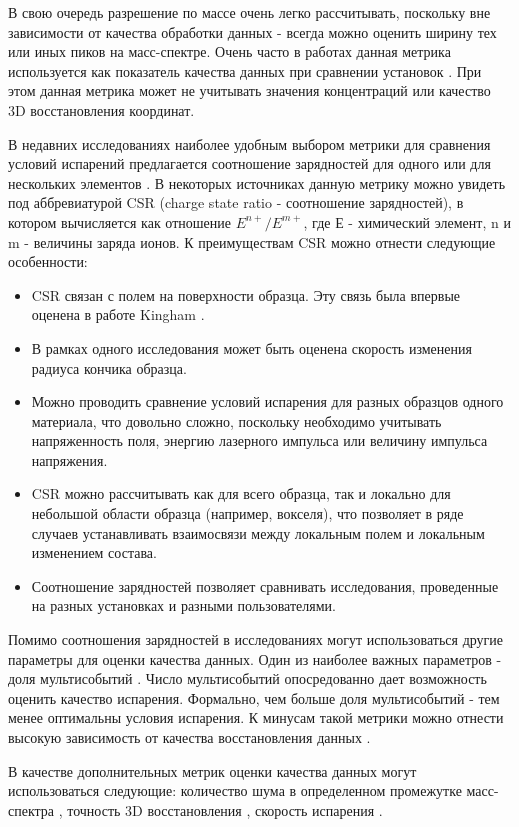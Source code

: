 В свою очередь разрешение по массе очень легко рассчитывать, поскольку вне зависимости от качества обработки данных - всегда можно оценить ширину тех или иных пиков на масс-спектре. Очень часто в работах данная метрика используется как показатель качества данных при сравнении установок \cite{Tegg23}. При этом данная метрика может не учитывать значения концентраций или качество 3D восстановления координат.

В недавних исследованиях наиболее удобным выбором метрики для сравнения условий испарений предлагается соотношение зарядностей для одного или для нескольких элементов \cite{Tu15,Vurpillot16,Diercks13,Mancini14}. В некоторых источниках данную метрику можно увидеть под аббревиатурой CSR (charge state ratio - соотношение зарядностей), в котором вычисляется как отношение $E^{n+}/E^{m+}$, где Е - химический элемент, n и m - величины заряда ионов. К преимуществам CSR можно отнести следующие особенности:
\begin{itemize}
	\item CSR связан с полем на поверхности образца. Эту связь была впервые оценена в работе Kingham \cite{Kingham82}.
	\item В рамках одного исследования может быть оценена скорость изменения радиуса кончика образца.
	\item Можно проводить сравнение условий испарения для разных образцов одного материала, что довольно сложно, поскольку необходимо учитывать напряженность поля, энергию лазерного импульса или величину импульса напряжения.
	\item CSR можно рассчитывать как для всего образца, так и локально для небольшой области образца (например, вокселя), что позволяет в ряде случаев устанавливать взаимосвязи между локальным полем и локальным изменением состава.
	\item Соотношение зарядностей позволяет сравнивать исследования, проведенные на разных установках и разными пользователями.
\end{itemize} 

Помимо соотношения зарядностей в исследованиях могут использоваться другие параметры для оценки качества данных. Один из наиболее важных параметров - доля мультисобытий \cite{Valderrama15}. Число мультисобытий опосредованно дает возможность оценить качество испарения. Формально, чем больше доля мультисобытий - тем менее оптимальны условия испарения. К минусам такой метрики можно отнести высокую зависимость от качества восстановления данных \cite{DaCosta12}.

В качестве дополнительных метрик оценки качества данных могут использоваться следующие: количество шума в определенном промежутке масс-спектра \cite{Valderrama15}, точность 3D восстановления \cite{Tegg23}, скорость испарения \cite{Raznitsyn18}.


